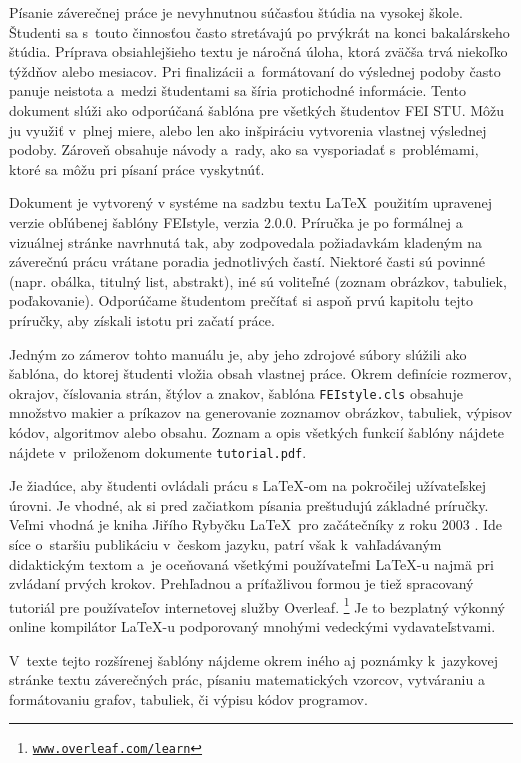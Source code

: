 Písanie záverečnej práce je nevyhnutnou súčasťou štúdia na vysokej škole.
Študenti sa s~touto činnosťou často stretávajú po prvýkrát na konci bakalárskeho štúdia.
Príprava obsiahlejšieho textu je náročná úloha,
ktorá zväčša trvá niekoľko týždňov alebo mesiacov.
Pri finalizácii a~formátovaní do výslednej podoby často panuje neistota a~medzi študentami sa šíria protichodné informácie.
Tento dokument slúži ako odporúčaná šablóna pre všetkých študentov FEI STU.
Môžu ju využiť v~plnej miere, alebo len ako inšpiráciu vytvorenia vlastnej výslednej podoby.
Zároveň obsahuje návody a~rady,
ako sa vysporiadať s~problémami,
ktoré sa môžu pri písaní práce vyskytnúť.

Dokument je vytvorený v systéme na sadzbu textu \LaTeX\ použitím upravenej verzie obľúbenej šablóny
FEIstyle, verzia 2.0.0. Príručka je po formálnej a vizuálnej stránke navrhnutá tak,
aby zodpovedala požiadavkám kladeným na záverečnú prácu vrátane poradia jednotlivých častí.
Niektoré časti sú povinné (napr. obálka, titulný list, abstrakt),
iné sú voliteľné (zoznam obrázkov, tabuliek, poďakovanie).
Odporúčame študentom prečítať si aspoň prvú kapitolu tejto príručky, aby získali istotu pri začatí práce.

Jedným zo zámerov tohto manuálu je,
aby jeho zdrojové súbory slúžili ako šablóna,
do ktorej študenti vložia obsah vlastnej práce.
Okrem definície rozmerov, okrajov, číslovania strán, štýlov a znakov, šablóna \verb|FEIstyle.cls| obsahuje množstvo makier a príkazov na generovanie zoznamov obrázkov, tabuliek, výpisov kódov, algoritmov alebo obsahu.
Zoznam a opis všetkých funkcií šablóny nájdete nájdete v~priloženom dokumente \verb|tutorial.pdf|.

Je žiadúce, aby študenti ovládali prácu s \LaTeX-om na pokročilej užívateľskej úrovni.
Je vhodné, ak si pred začiatkom písania preštudujú základné príručky. Veľmi vhodná je kniha
Jiřího Rybyčku \LaTeX\ pro začátečníky z roku 2003 \cite{Rybicka2003Latex}.
Ide síce o~staršiu publikáciu v~českom jazyku,
patrí však k~vahľadávaným didaktickým textom
a~je oceňovaná všetkými používateľmi \LaTeX-u najmä pri zvládaní prvých krokov.
Prehľadnou a príťažlivou formou je tiež spracovaný tutoriál pre používateľov internetovej služby Overleaf.%
\footnote{\href{https://www.overleaf.com/learn}{\texttt{www.overleaf.com/learn}}}
Je to bezplatný výkonný online kompilátor \LaTeX-u podporovaný mnohými vedeckými vydavateľstvami.

V~texte tejto rozšírenej šablóny nájdeme okrem iného aj poznámky k~jazykovej stránke textu záverečných prác, písaniu matematických vzorcov, vytváraniu a formátovaniu grafov, tabuliek, či výpisu kódov programov.

